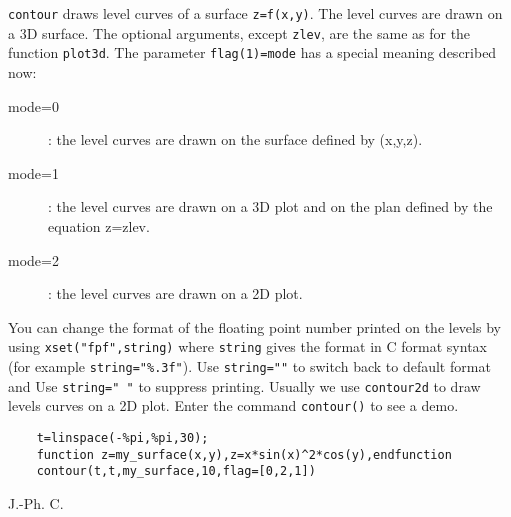 \begin{mandescription}
  \verb!contour! draws level curves of a surface \verb!z=f(x,y)!. The level curves are
  drawn on a 3D surface. The optional arguments, except \verb!zlev!, are the same as
  for the function \verb!plot3d!. The parameter \verb!flag(1)=mode! has a special meaning
  described now:
  \begin{description}
  \item[mode=0] : the level curves are drawn on the surface defined by (x,y,z).
  \item[mode=1] : the level curves are drawn on a 3D plot and on the plan defined
    by  the equation z=zlev.
  \item[mode=2] : the level curves are drawn on a 2D plot.
  \end{description}

  You can change the format of the floating point number printed on the levels
  by using \verb!xset("fpf",string)! where \verb!string! gives the
  format in C format syntax (for example \verb!string="%.3f"!). Use
  \verb!string=""! to switch back to default format and Use
  \verb!string=" "! to suppress printing.
  Usually we use \verb!contour2d! to draw levels curves on a 2D plot.
  Enter the command \verb!contour()! to see a demo.
\end{mandescription}

\begin{examples}
  \begin{Verbatim}
    t=linspace(-%pi,%pi,30);
    function z=my_surface(x,y),z=x*sin(x)^2*cos(y),endfunction
    contour(t,t,my_surface,10,flag=[0,2,1])
  \end{Verbatim}
\end{examples}
\begin{manseealso}
   
\end{manseealso}
\begin{authors}
  J.-Ph. C.
\end{authors}
